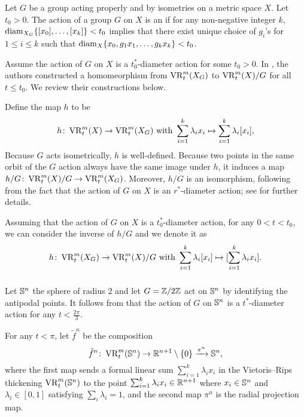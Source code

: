 \subsubsection{}


Let $G$ be a group acting properly and by isometries on a metric space $X$.
Let $t_0>0$. The action of a group $G$ on $X$ is an  if for any non-negative integer $k$, $\operatorname{diam}_{X_G}\{[x_0],\dots,[x_k]\}<t_0$ implies that there exist unique choice of $g_i$'s for $1\leq i\leq k$ such that $\operatorname{diam}_{X}\{x_0,g_1x_1,\dots,g_kx_k\}<t_0$. 

Assume the action of $G$ on $X$ is a $t_0^*$-diameter action for some $t_0> 0$.
In \cite[Proposition 3.5]{adams2022metric}, the authors constructed a homomeorphism from $\operatorname{VR}_t^m(X_G)$ to $\operatorname{VR}_t^m(X)/G$ for all $t \leq t_0$.
We review their constructions below. 

Define the map $h$ to be
\[
h \colon \operatorname{VR}_t^m(X) \to \operatorname{VR}_t^m(X_G) 
\text{ with }
\sum_{i=1}^k \lambda_i x_i \mapsto \sum_{i=1}^k \lambda_i [x_i],
\]
Because $G$ acts isometrically, $h$ is well-defined.
Because two points in the same orbit of the $G$ action always have the same image under $h$, it induces a map $h/G \colon \operatorname{VR}_t^m(X)/G \to \operatorname{VR}_t^m(X_G)$.
Moreover, $h/G$ is an isomorphism, following from the fact that the action of $G$ on $X$ is an $r^*$-diameter action; see \cite[Proposition 3.5]{adams2022metric} for further details.

Assuming that the action of $G$ on $X$ is a $t_0^*$-diameter action, for any $0<t<t_0$, we can consider the inverse of $h/G$ and we denote it as
\[
h \colon \operatorname{VR}_t^m(X_G) \to \operatorname{VR}_t^m(X)/G
\text{ with }
\sum_{i=1}^k \lambda_i [x_i] \mapsto [\sum_{i=1}^k \lambda_i x_i].
\]


\subsubsection{}

Let $\mathbb{S}^n$ the sphere of radius $2$ and let $G=\mathbb{Z}/2\mathbb{Z}$ act on $\mathbb{S}^n$ by identifying the antipodal points.
It follows from \cite[Corollary]{adams2022metric} that the action of $G$ on $\mathbb{S}^n$ is a $t^*$-diameter action for any $t<\tfrac{2\pi}{3}$.

For any $t<\pi$, let $\tilde{f}^n$ be the composition
\[
    \tilde{f}^n \colon \operatorname{VR}_t^m(\mathbb{S}^n) \to \mathbb{R}^{n+1} \setminus \{0\} \xrightarrow{\pi^n} \mathbb{S}^n,
\]
where the first map sends a formal linear sum $\sum_{i=1}^k \lambda_i x_i$ in the Vietoris--Rips thickening $\operatorname{VR}_t^m(\mathbb{S}^n)$ to the point $\sum_{i=1}^k \lambda_i x_i \in \mathbb{R}^{n+1}$ where $x_i \in \mathbb{S}^n$ and $\lambda_i \in [0,1]$ satisfying $\sum_i\lambda_i=1$, and the second map $\pi^n$ is the radial projection map.

